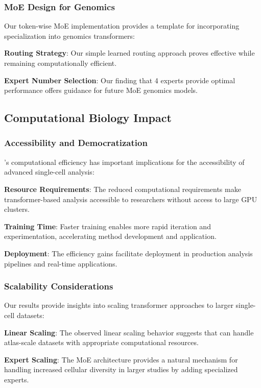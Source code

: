 \subsubsection{MoE Design for Genomics}

Our token-wise MoE implementation provides a template for incorporating specialization into genomics transformers:

\textbf{Routing Strategy}: Our simple learned routing approach proves effective while remaining computationally efficient.

\textbf{Expert Number Selection}: Our finding that 4 experts provide optimal performance offers guidance for future MoE genomics models.

\subsection{Computational Biology Impact}

\subsubsection{Accessibility and Democratization}

\bioformer{}'s computational efficiency has important implications for the accessibility of advanced single-cell analysis:

\textbf{Resource Requirements}: The reduced computational requirements make transformer-based analysis accessible to researchers without access to large GPU clusters.

\textbf{Training Time}: Faster training enables more rapid iteration and experimentation, accelerating method development and application.

\textbf{Deployment}: The efficiency gains facilitate deployment in production analysis pipelines and real-time applications.

\subsubsection{Scalability Considerations}

Our results provide insights into scaling transformer approaches to larger single-cell datasets:

\textbf{Linear Scaling}: The observed linear scaling behavior suggests that \bioformer{} can handle atlas-scale datasets with appropriate computational resources.

\textbf{Expert Scaling}: The MoE architecture provides a natural mechanism for handling increased cellular diversity in larger studies by adding specialized experts.

